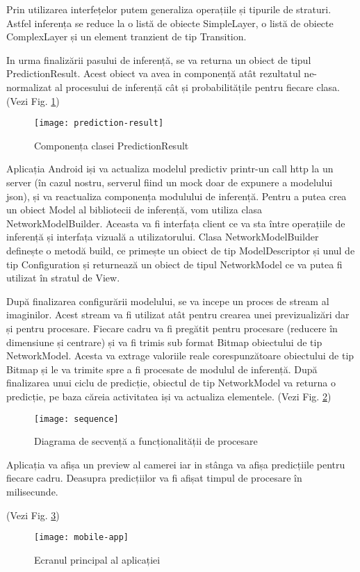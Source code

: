 	Prin utilizarea interfețelor putem generaliza operațiile și tipurile de straturi. Astfel inferența se reduce la o listă de obiecte SimpleLayer, o listă de obiecte ComplexLayer și un element tranzient de tip Transition.
	
	In urma finalizării pasului de inferență, se va returna un obiect de tipul PredictionResult. Acest obiect va avea in componență atât rezultatul ne-normalizat al procesului de inferență cât și probabilitățile pentru fiecare clasa.(Vezi Fig. \ref{fig:prediction-result})
	
	\begin{figure}[H]
		\texttt{[image: prediction-result]}
		\caption{\label{fig:prediction-result} Componența clasei PredictionResult}
	\end{figure}
	
	\vfill
	
	Aplicația Android iși va actualiza modelul predictiv printr-un call http la un server (în cazul nostru, serverul fiind un mock doar de expunere a modelului json), și va reactualiza componența modulului de inferență. Pentru a putea crea un obiect Model al bibliotecii de inferență, vom utiliza clasa NetworkModelBuilder. Aceasta va fi interfața client ce va sta între operațiile de inferență și interfața vizuală a utilizatorului. Clasa NetworkModelBuilder definește o metodă build, ce primește un obiect de tip ModelDescriptor și unul de tip Configuration și returnează un obiect de tipul NetworkModel ce va putea fi utilizat în stratul de View. 
	
	\newpage
	
	După finalizarea configurării modelului, se va incepe un proces de stream al imaginilor. Acest stream va fi utilizat atât pentru crearea unei previzualizări dar și pentru procesare. Fiecare cadru va fi pregătit pentru procesare (reducere în dimensiune și centrare) și va fi trimis sub format Bitmap obiectului de tip NetworkModel. 
	Acesta va extrage valoriile reale corespunzătoare obiectului de tip Bitmap și le va trimite spre a fi procesate de modulul de inferență. După finalizarea unui ciclu de predicție, obiectul de tip NetworkModel va returna o predicție, pe baza căreia activitatea iși va actualiza elementele.
	(Vezi Fig. \ref{fig:prediction-sequence})\newline
	
	\begin{figure}[H]
		\texttt{[image: sequence]}
		\caption{\label{fig:prediction-sequence} Diagrama de secvență a funcționalității de procesare}
	\end{figure}

	\newpage
	Aplicația va afișa un preview al camerei iar in stânga va afișa predicțiile pentru fiecare cadru. Deasupra predicțiilor va fi afișat timpul de procesare în milisecunde.
	
	(Vezi Fig. \ref{fig:mobile-app})\newline 	
	
	
		\begin{figure}[H]
		\texttt{[image: mobile-app]}
		\caption{\label{fig:mobile-app} Ecranul principal al aplicației}
	\end{figure}
